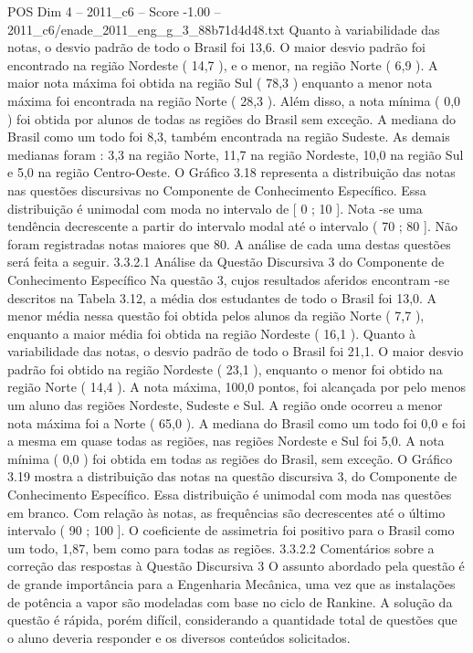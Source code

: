 \begin{textsample}{POS Dim 4 – 2011\_c6 – Score -1.00 – 2011\_c6/enade\_2011\_eng\_g\_3\_88b71d4d48.txt}
Quanto à variabilidade das notas, o desvio padrão de todo o Brasil foi 13,6.
O maior desvio padrão foi encontrado na região Nordeste ( 14,7 ), e o menor, na região Norte ( 6,9 ).
A maior nota máxima foi obtida na região Sul ( 78,3 ) enquanto a menor nota máxima foi encontrada na região Norte ( 28,3 ).
Além disso, a nota mínima ( 0,0 ) foi obtida por alunos de todas as regiões do Brasil sem exceção.
A mediana do Brasil como um todo foi 8,3, também encontrada na região Sudeste.
As demais medianas foram : 3,3 na região Norte, 11,7 na região Nordeste, 10,0 na região Sul e 5,0 na região Centro-Oeste.
O Gráfico 3.18 representa a distribuição das notas nas questões discursivas no Componente de Conhecimento Específico.
Essa distribuição é unimodal com moda no intervalo de [ 0 ; 10 ].
Nota -se uma tendência decrescente a partir do intervalo modal até o intervalo ( 70 ; 80 ].
Não foram registradas notas maiores que 80.
A análise de cada uma destas questões será feita a seguir. 3.3.2.1 Análise da Questão Discursiva 3 do Componente de Conhecimento Específico Na questão 3, cujos resultados aferidos encontram -se descritos na Tabela 3.12, a média dos estudantes de todo o Brasil foi 13,0.
A menor média nessa questão foi obtida pelos alunos da região Norte ( 7,7 ), enquanto a maior média foi obtida na região Nordeste ( 16,1 ).
Quanto à variabilidade das notas, o desvio padrão de todo o Brasil foi 21,1.
O maior desvio padrão foi obtido na região Nordeste ( 23,1 ), enquanto o menor foi obtido na região Norte ( 14,4 ).
A nota máxima, 100,0 pontos, foi alcançada por pelo menos um aluno das regiões Nordeste, Sudeste e Sul.
A região onde ocorreu a menor nota máxima foi a Norte ( 65,0 ).
A mediana do Brasil como um todo foi 0,0 e foi a mesma em quase todas as regiões, nas regiões Nordeste e Sul foi 5,0.
A nota mínima ( 0,0 ) foi obtida em todas as regiões do Brasil, sem exceção.
O Gráfico 3.19 mostra a distribuição das notas na questão discursiva 3, do Componente de Conhecimento Específico.
Essa distribuição é unimodal com moda nas questões em branco.
Com relação às notas, as frequências são decrescentes até o último intervalo ( 90 ; 100 ].
O coeficiente de assimetria foi positivo para o Brasil como um todo, 1,87, bem como para todas as regiões. 3.3.2.2 Comentários sobre a correção das respostas à Questão Discursiva 3 O assunto abordado pela questão é de grande importância para a Engenharia Mecânica, uma vez que as instalações de potência a vapor são modeladas com base no ciclo de Rankine.
A solução da questão é rápida, porém difícil, considerando a quantidade total de questões que o aluno deveria responder e os diversos conteúdos solicitados.

\end{textsample}
